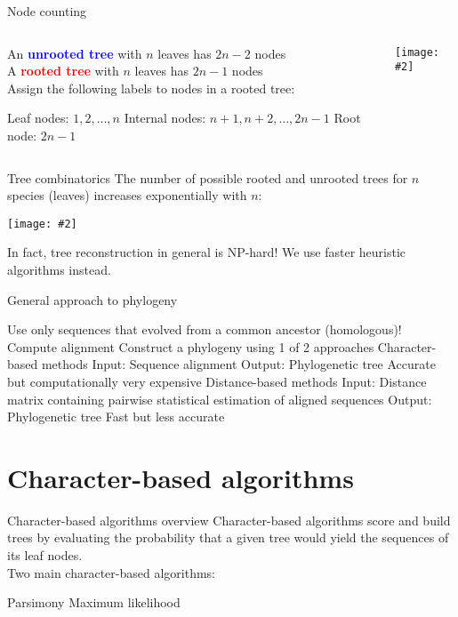\documentclass{beamer}
\renewcommand{\c}[1]{\begin{center}#1\end{center}}
\newcommand{\blu}[1]{\textcolor{blue}{\textbf{#1}}}
\newcommand{\red}[1]{\textcolor{red}{\textbf{#1}}}
\newcommand{\gr}[2][.95]{\c{\texttt{[image: \#2]}}}
\begin{document}
\begin{frame}{Node counting}
    \begin{columns}
        \begin{column}{0.7\textwidth}
            An \blu{unrooted tree} with $n$ leaves has $2n-2$ nodes\\
            \bigskip
            A \red{rooted tree} with $n$ leaves has $2n-1$ nodes\\
            \bigskip
            Assign the following labels to nodes in a rooted tree:
            \begin{outline}
                \1 Leaf nodes: $1,2,\ldots,n$
                \1 Internal nodes: $n+1, n+2, \ldots, 2n-1$
                \1 Root node: $2n-1$
            \end{outline}
        \end{column}
        \begin{column}{0.3\textwidth}
            \gr{l5_figs/s11_phylogenetic_tree.png}
        \end{column}
    \end{columns}
\end{frame}

\begin{frame}{Tree combinatorics}
    The number of possible rooted and unrooted trees for $n$ species (leaves) increases exponentially with $n$:
    \gr[0.5]{l5_figs/s13_possible_trees.png}
    In fact, tree reconstruction in general is NP-hard! We use faster heuristic algorithms instead.
\end{frame}

\begin{frame}{General approach to phylogeny}
    \begin{outline}
        \1 Use only sequences that evolved from a common ancestor (homologous)!
        \1 Compute alignment
        \1 Construct a phylogeny using 1 of 2 approaches
            \2 Character-based methods
                \3 Input: Sequence alignment
                \3 Output: Phylogenetic tree
                \3 Accurate but computationally very expensive
            \2 Distance-based methods
                \3 Input: Distance matrix containing pairwise statistical estimation of aligned sequences
                \3 Output: Phylogenetic tree
                \3 Fast but less accurate
    \end{outline}
\end{frame}

\section{Character-based algorithms}
\begin{frame}{Character-based algorithms overview}
    Character-based algorithms score and build trees by evaluating the probability that a given tree would yield the sequences of its leaf nodes.\\
    \bigskip
    Two main character-based algorithms:
    \begin{outline}
        \1 Parsimony
        \1 Maximum likelihood
    \end{outline}
\end{frame}
\end{document}
